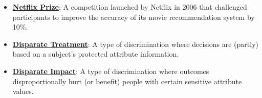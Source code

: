 \documentclass{article}%
\begin{document}
\begin{itemize}[leftmargin=*]
\item \href{https://purdue.brightspace.com/d2l/common/assets/pdfjs-d2l-dist/1.0.14-legacy/web/viewer.html?file=\%2Fcontent\%2Fenforced\%2F1095465-WL.202510.CS24200.LE1\%2F242-19-svd-pca.pdf\%3Fou\%3D1095465\&lang=en-us\&container=d2l-fileviewer-rendered-pdf\&fullscreen=d2l-fileviewer-rendered-pdf-dialog\&height=667#page=41}{\textbf{Netflix Prize}}: A competition launched by Netflix in 2006 that challenged participants to improve the accuracy of its movie recommendation system by 10\%.%
\end{itemize}%
\begin{itemize}[leftmargin=*]%
\item \href{https://purdue.brightspace.com/d2l/common/assets/pdfjs-d2l-dist/1.0.14-legacy/web/viewer.html?file=\%2Fcontent\%2Fenforced\%2F1095465-WL.202510.CS24200.LE1\%2F25-ethics.pdf\%3Fou\%3D1095465\&lang=en-us\&container=d2l-fileviewer-rendered-pdf\&fullscreen=d2l-fileviewer-rendered-pdf-dialog\&height=667#page=17}{\textbf{Disparate Treatment}}: A type of discrimination where decisions are (partly) based on a subject's protected attribute information.%
\item \href{https://purdue.brightspace.com/d2l/common/assets/pdfjs-d2l-dist/1.0.14-legacy/web/viewer.html?file=\%2Fcontent\%2Fenforced\%2F1095465-WL.202510.CS24200.LE1\%2F25-ethics.pdf\%3Fou\%3D1095465\&lang=en-us\&container=d2l-fileviewer-rendered-pdf\&fullscreen=d2l-fileviewer-rendered-pdf-dialog\&height=667#page=17}{\textbf{Disparate Impact}}: A type of discrimination where outcomes disproportionally hurt (or benefit) people with certain sensitive attribute values.%
\end{itemize}

%
\end{document}
